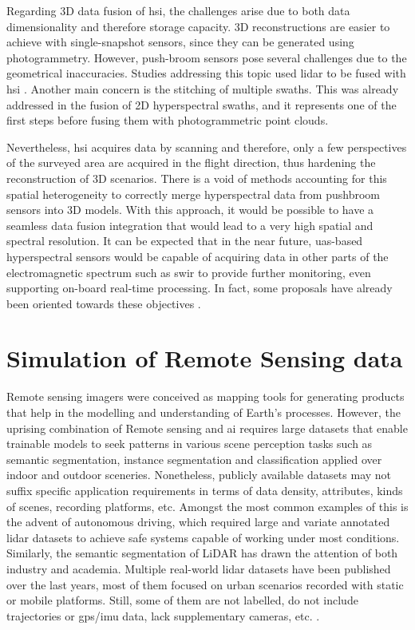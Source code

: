 Regarding 3D data fusion of \acrshort{hsi}, the challenges arise due to both data dimensionality and therefore storage capacity. 3D reconstructions are easier to achieve with single-snapshot sensors, since they can be generated using photogrammetry. However, push-broom sensors pose several challenges due to the geometrical inaccuracies. Studies addressing this topic used \acrshort{lidar} to be fused with \acrshort{hsi} \cite{lin_detection_2019, sankey_uav_2018}. Another main concern is the stitching of multiple swaths. This was already addressed in the fusion of 2D hyperspectral swaths, and it represents one of the first steps before fusing them with photogrammetric point clouds. 

Nevertheless, \acrshort{hsi} acquires data by scanning and therefore, only a few perspectives of the surveyed area are acquired in the flight direction, thus hardening the reconstruction of 3D scenarios. There is a void of methods accounting for this spatial heterogeneity to correctly merge hyperspectral data from pushbroom sensors into 3D models. With this approach, it would be possible to have a seamless data fusion integration that would lead to a very high spatial and spectral resolution. It can be expected that in the near future, \acrshort{uas}-based hyperspectral sensors would be capable of acquiring data in other parts of the electromagnetic spectrum such as \acrshort{swir} to provide further monitoring, even supporting on-board real-time processing. In fact, some proposals have already been oriented towards these objectives \cite{horstrand_uav_2019, saari_visible_2017}.

\section{Simulation of Remote Sensing data}

Remote sensing imagers were conceived as mapping tools for generating products that help in the modelling and understanding of Earth's processes. However, the uprising combination of Remote sensing and \acrshort{ai} requires large datasets that enable trainable models to seek patterns in various scene perception tasks such as semantic segmentation, instance segmentation and classification applied over indoor and outdoor sceneries. Nonetheless, publicly available datasets may not suffix specific application requirements in terms of data density, attributes, kinds of scenes, recording platforms, etc. Amongst the most common examples of this is the advent of autonomous driving, which required large and variate annotated \acrshort{lidar} datasets to achieve safe systems capable of working under most conditions. Similarly, the semantic segmentation of LiDAR has drawn the attention of both industry and academia. Multiple real-world \acrshort{lidar} datasets have been published over the last years, most of them focused on urban scenarios recorded with static or mobile platforms. Still, some of them are not labelled, do not include trajectories or \acrshort{gps}/\acrshort{imu} data, lack supplementary cameras, etc. \cite{cai_survey_2022}. 

